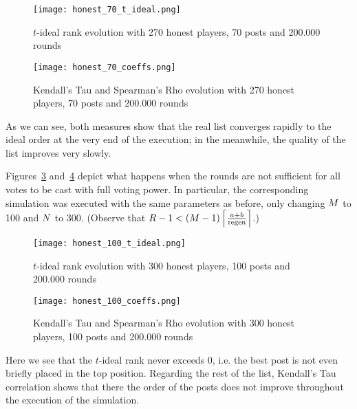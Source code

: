       \begin{figure}[!htbp]
        \texttt{[image: honest\_70\_t\_ideal.png]}
        \caption{$t$-ideal rank evolution with 270 honest players, 70 posts and
        200.000 rounds}
        \label{fig:honest:70:tideal}
      \end{figure}

      \begin{figure}[!htbp]
        \texttt{[image: honest\_70\_coeffs.png]}
        \caption{Kendall's Tau and Spearman's Rho evolution with 270 honest
        players, 70 posts and 200.000 rounds}
        \label{fig:honest:70:coeffs}
      \end{figure}

      As we can see, both measures show that the real list converges rapidly to
      the ideal order at the very end of the execution; in the meanwhile, the
      quality of the list improves very slowly.

      Figures~\ref{fig:honest:100:tideal} and~\ref{fig:honest:100:coeffs} depict
      what happens when the rounds are not sufficient for all votes to be cast
      with full voting power. In particular, the corresponding simulation was
      executed with the same parameters as before, only changing $\postlen$ to
      100 and $\playerlen$ to 300. (Observe that $\rounds - 1 < \left(\postlen -
      1\right)\ceil*{\frac{a + b}{\regen}}$.)

      \begin{figure}[!htbp]
        \texttt{[image: honest\_100\_t\_ideal.png]}
        \caption{$t$-ideal rank evolution with 300 honest players, 100 posts and
        200.000 rounds}
        \label{fig:honest:100:tideal}
      \end{figure}

      \begin{figure}[!htbp]
        \texttt{[image: honest\_100\_coeffs.png]}
        \caption{Kendall's Tau and Spearman's Rho evolution with 300 honest
        players, 100 posts and 200.000 rounds}
        \label{fig:honest:100:coeffs}
      \end{figure}

      Here we see that the $t$-ideal rank never exceeds 0, i.e. the best post is
      not even briefly placed in the top position. Regarding the rest of the
      list, Kendall's Tau correlation shows that there the order of the posts
      does not improve throughout the execution of the simulation.

